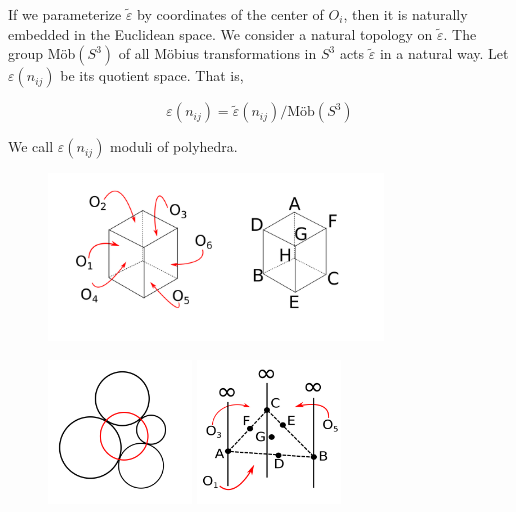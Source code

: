 \documentclass[suppldata, dvipdfmx]{interact}
\theoremstyle{plain}%
\theoremstyle{definition}
\theoremstyle{remark}
\theoremstyle{problemstyle}
\begin{document}
If we parameterize $\tilde\varepsilon$ by coordinates of the center of
$O_i$, then it is naturally embedded in the Euclidean space. We consider
a natural topology on $\tilde\varepsilon$. The group M\"ob$(S^3)$ of all
M\"obius transformations in $S^3$ acts $\tilde\varepsilon$ in a natural way.
Let $\varepsilon(n_{ij})$ be its quotient space. That is,

$$
\varepsilon (n_{ij}) = \tilde\varepsilon(n_{ij}) / \text{M\"ob}(S^3)
$$

\noindent We call $\varepsilon(n_{ij})$ moduli of polyhedra.

\begin{figure}[h!tbp]
 \centering
 \includegraphics[width=3.5in,
 keepaspectratio]{./img/HexahedraWithSphericalFaces/cubes.png}
 \caption{}
 \label{fig:cubes}
\end{figure}

\begin{figure}[h!tbp]
 \begin{minipage}[t]{0.5\textwidth}
 \centering
 \includegraphics[width=1.5in, height=1.5in,
 keepaspectratio]{./img/HexahedraWithSphericalFaces/chain.png}
 \caption{}
 \label{fig:chainCircles}
 \end{minipage}
 \hspace*{\fill}
 \begin{minipage}[t]{0.5\textwidth}
  \centering
  \includegraphics[width=1.5in, height=1.5in,
  keepaspectratio]{./img/HexahedraWithSphericalFaces/infTriangle.png}
  \caption{}
  \label{fig:infTriangle}
 \end{minipage}
 \hspace*{\fill}
\end{figure}
\end{document}
